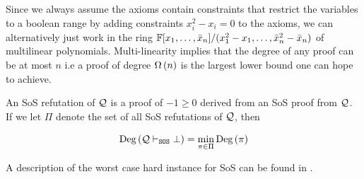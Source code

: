 \documentclass[11pt]{article}
\begin{document}
Since we always assume the axioms contain constraints that restrict the variables to a boolean range by adding constraints $x_i^2 - x_i=0$ to the axioms, we can alternatively just work in the ring $\mathbb{F}[x_1, \dots, \bar{x}_n]/(x_1^2 - x_1, \dots, \bar{x}_n^2 - \bar{x}_n)$ of multilinear polynomials.
Multi-linearity implies that the degree of any proof can be at most $n$ i.e a proof of degree $\Omega\left(n\right)$ is the largest lower bound one can hope to achieve.

\begin{definition}
An SoS refutation of $\mathcal{Q}$ is a proof of $-1 \geq 0$ derived from an SoS proof from $\mathcal{Q}$. If we let $\Pi$ denote the set of all SoS refutations of $\mathcal{Q}$, then

\[ \text{Deg}\left(\mathcal{Q} \vdash_{\texttt{SOS}} \bot\right) = \min_{\pi \in \Pi}\text{Deg}\left(\pi\right)\]

\end{definition}




A description of the  worst case hard instance for SoS can be found in \citep[Theorem A.3]{Austrin_2022}.
\end{document}
